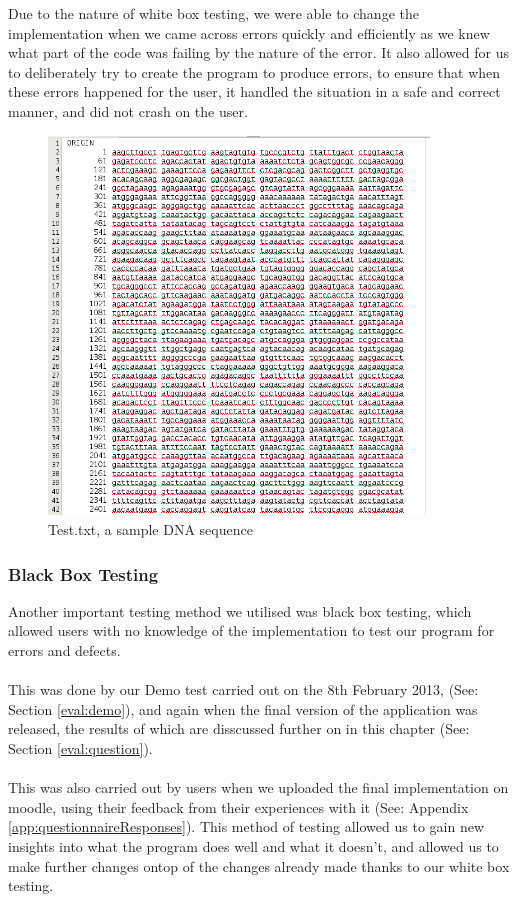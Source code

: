 Due to the nature of white box testing, we were able to change the
implementation when we came across errors quickly and efficiently as
we knew what part of the code was failing by the nature of the error.
It also allowed for us to deliberately try to create the program to
produce errors, to ensure that when these errors happened for the user,
it handled the situation in a safe and correct manner, and did not crash on the user.

\begin{figure}[h]
  \begin{center}
   \includegraphics[width=0.9\textwidth]{./images/demoBuild/test.png}
   \caption{
     \label{fig:demoBuild:test}
     Test.txt, a sample DNA sequence
    }
\end{center}
\end{figure}

\subsubsection{Black Box Testing}

Another important testing method we utilised was black box testing,
which allowed users with no knowledge of the implementation to test
our program for errors and defects. \\ \\
This was done by our Demo test carried out on the 8th February 2013, (See:
Section \ref{eval:demo}), and again when the final version of the application
was released, the results of which are disscussed further on in this chapter 
(See: Section \ref{eval:question}). \\ \\
This was also carried out by users when we uploaded the final
implementation on moodle, using their feedback from their experiences
with it (See: Appendix \ref{app:questionnaireResponses}).
This method of testing allowed us to gain new insights into what the
program does well and what it doesn't, and allowed us to make further
changes ontop of the changes already made thanks to our white box
testing.






